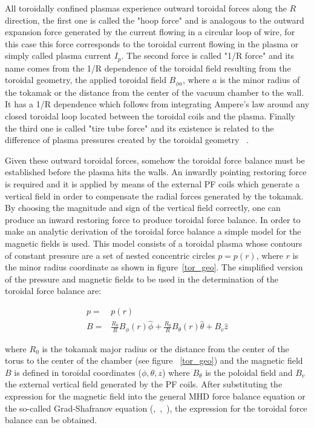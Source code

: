 All toroidally confined plasmas experience  outward toroidal forces along the $R$ direction, the first one is called the "hoop force" and is analogous to  the outward expansion force generated by the current flowing in a circular loop of wire, for this case this force corresponds to the toroidal current flowing in the plasma or simply called plasma current $I_p$. The second force is called "1/R force" and its name comes from the 1/R dependence of the toroidal field resulting from the toroidal geometry, the applied toroidal field $B_{\phi a}$,  where $a$ is the minor radius of the tokamak or the distance from the center of the vacuum chamber to the wall. It has a 1/R dependence which follows from integrating Ampere's law around any closed toroidal loop located between the toroidal coils and the plasma. Finally the third one is called "tire tube force" and its existence is related to the difference of plasma pressures created by the toroidal geometry ~\cite[Chapter~11]{Freidberg2007}. \smallskip 
 
Given these outward toroidal forces, somehow the  toroidal force balance must be established before the plasma hits the walls. An inwardly pointing restoring force is required and it is applied by means of the external PF coils which generate a vertical field in order to compensate the radial forces generated by the tokamak.  By choosing the magnitude and sign of the vertical field correctly, one can produce an inward restoring force to produce toroidal force balance. In order to make an analytic derivation of the toroidal force balance a simple model for the magnetic fields is used. This model consists of a toroidal plasma whose contours of constant pressure are a set of nested concentric circles $p=p(r)$, where $r$ is the minor radius coordinate as shown in figure~\ref{tor_geo}. The simplified version of the pressure and magnetic fields to be used in the determination of the toroidal force balance are:

	\begin{equation}
	\begin{aligned}
	p=&p(r)\\
	B =& \frac{R_0}{R}B_{\phi}(r) \hat{\phi} + \frac{R_0}{R}B_{\theta}(r)\hat{\theta}+B_v \hat{z}
	\end{aligned}
	\end{equation}
	
\noindent where $R_0$ is the tokamak major radius or the distance from the center of the torus to the center of the chamber (see figure ~\ref{tor_geo}) and the magnetic field $B$ is defined in toroidal coordinates ($\phi,\theta,z$) where $B_{\theta}$ is the poloidal field and $B_v$ the external vertical field generated by the PF coils. After substituting the expression for the magnetic field into the general MHD force balance equation or the so-called Grad-Shafranov equation (\cite[Chapter~6]{Miyamoto2011},~\cite[Chapter~11]{Freidberg2007},~\cite[Chpater~2]{Zohm2015}), the expression for the toroidal force balance can be obtained.
\smallskip

